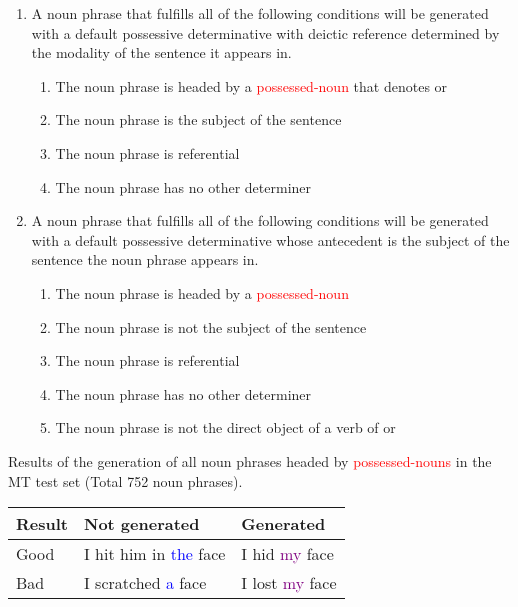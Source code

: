 \documentclass[a4paper,landscape,headrule,footrule,dvips]{foils}
\newcommand{\psp}[1]{\textcolor{purple}{#1}}
\newcommand{\dtr}[1]{\textcolor{blue}{#1}}
\newcommand{\trg}[1]{\textcolor{red}{#1}}
\begin{document}
\begin{CJK}{UTF8}{min}
{\small
     \begin{enumerate} %
     \item A noun phrase that fulfills all of the following conditions
       will be generated with a default possessive determinative with
       deictic reference determined by the modality of the sentence it
       appears in.
        \begin{enumerate}
        \item The noun phrase is headed by a \trg{possessed-noun} that
          denotes  or 
        \item The noun phrase is the subject of the sentence
        \item The noun phrase is referential
        \item The noun phrase has no other determiner
        \end{enumerate}
      \item A noun phrase that fulfills all of the following
        conditions will be generated with a default possessive
        determinative whose antecedent is the subject of the sentence
        the noun phrase appears in.
        \begin{enumerate}
        \item The noun phrase is headed by a \trg{possessed-noun} 
        \item The noun phrase is not the subject of the sentence
        \item The noun phrase is referential
        \item The noun phrase has no other determiner
        \item The noun phrase is not the direct object of a verb of
           or 
        \end{enumerate}
      \end{enumerate}
}


Results of the generation of all noun phrases headed by
\trg{possessed-nouns} in the MT test set (Total 752 noun phrases).

  \begin{center}
    \begin{tabular}{|l|l|l|} \hline
      Result & Not generated & Generated  \\ \hline
      Good &I hit him in \dtr{the} face  &  I hid \psp{my} face \\ \hline
      Bad &  I scratched \dtr{a} face       & I lost \psp{my} face \\ \hline
    \end{tabular}


\end{center}
\end{CJK}
\end{document}
